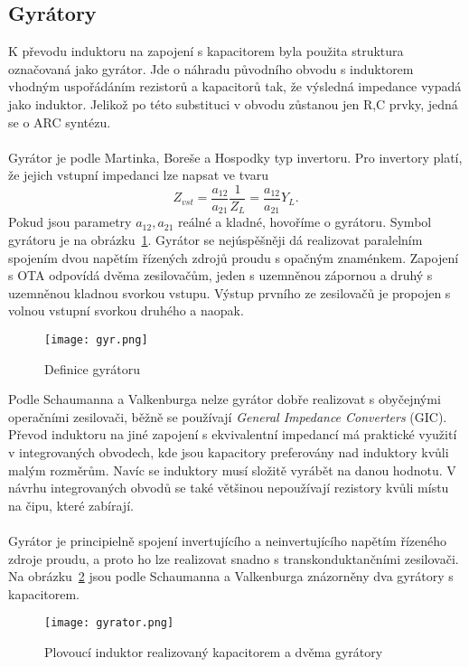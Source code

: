 \subsection{Gyrátory}\label{s:GYR}
\noindent K převodu induktoru na zapojení s kapacitorem byla použita struktura označovaná jako gyrátor. Jde o náhradu původního obvodu s induktorem vhodným uspořádáním rezistorů a kapacitorů tak, že výsledná impedance vypadá jako induktor. Jelikož po této substituci v obvodu zůstanou jen R,C prvky, jedná se o ARC syntézu. \\
\\
 Gyrátor je podle Martinka, Boreše a Hospodky \cite{12} typ invertoru. Pro invertory platí, že jejich vstupní impedanci lze napsat ve tvaru\begin{equation}
Z_{vst} = \frac{a_{12}}{a_{21}}\frac{1}{Z_L} = \frac{a_{12}}{a_{21}}Y_L.
\end{equation}
Pokud jsou parametry $a_{12}, a_{21}$ reálné a kladné, hovoříme o gyrátoru. Symbol gyrátoru je na obrázku~\ref{s:G}. Gyrátor se nejúspěšněji dá realizovat paralelním spojením dvou napětím řízených zdrojů proudu s opačným znaménkem. Zapojení s OTA odpovídá dvěma zesilovačům, jeden s uzemněnou zápornou a druhý s uzemněnou kladnou svorkou vstupu. Výstup prvního ze zesilovačů je propojen s volnou vstupní svorkou druhého a naopak.
\begin{figure}[h]
\centering
\texttt{[image: gyr.png]}
\caption{Definice gyrátoru \label{s:G}}
\end{figure}
Podle Schaumanna a Valkenburga \cite{13} nelze gyrátor dobře realizovat s obyčejnými operačními zesilovači, běžně se používají \textit{General Impedance Converters} (GIC). Převod induktoru na jiné zapojení s ekvivalentní impedancí má praktické využití v integrovaných obvodech, kde jsou kapacitory preferovány nad induktory kvůli malým rozměrům. Navíc se induktory musí složitě vyrábět na danou hodnotu. V návrhu integrovaných obvodů se také většinou nepoužívají rezistory kvůli místu na čipu, které zabírají. \\
\\
Gyrátor je principielně spojení invertujícího a neinvertujícího napětím řízeného zdroje proudu, a proto ho lze realizovat snadno s transkonduktančními zesilovači. Na obrázku~\ref{s:GO} jsou podle Schaumanna a Valkenburga \cite{13} znázorněny dva gyrátory s kapacitorem. 
\begin{figure}[h]
\centering
\texttt{[image: gyrator.png]}
\caption[Plovoucí induktor realizovaný kapacitorem a dvěma gyrátory]{Plovoucí induktor realizovaný kapacitorem a dvěma gyrátory \label{s:GO}}
\end{figure}
